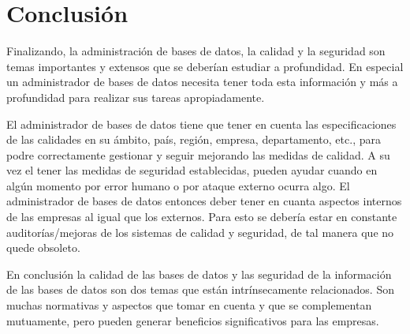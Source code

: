 \documentclass[12pt, article, natbib]{IEEEtran}
\begin{document}
\section{Conclusión}

Finalizando, la administración de bases de datos, la calidad y la seguridad son temas importantes y extensos que se deberían estudiar a profundidad. En especial un administrador de bases de datos necesita tener toda esta información y más a profundidad para realizar sus tareas apropiadamente. 

El administrador de bases de datos tiene que tener en cuenta las especificaciones de las calidades en su ámbito, país, región, empresa, departamento, etc., para podre correctamente gestionar y seguir mejorando las medidas de calidad. A su vez el tener las medidas de seguridad establecidas, pueden ayudar cuando en algún momento por error humano o por ataque externo ocurra algo. El administrador de bases de datos entonces deber tener en cuanta aspectos internos de las empresas al igual que los externos. Para esto se debería estar en constante auditorías/mejoras de los sistemas de calidad y seguridad, de tal manera que no quede obsoleto.

En conclusión la calidad de las bases de datos y las seguridad de la información de las bases de datos son dos temas que están intrínsecamente relacionados. Son muchas normativas y aspectos que tomar en cuenta y que se complementan mutuamente, pero pueden generar beneficios significativos para las empresas.

\newpage
\onecolumn

\nocite{chatgpt}
 

\end{document}
